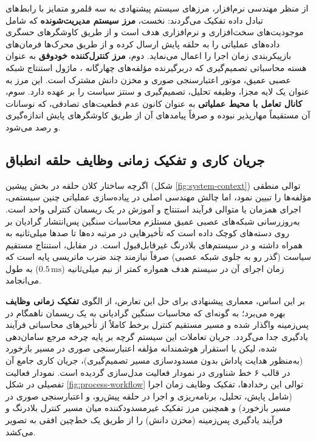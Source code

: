 \documentclass[oneside,openany,phd]{TMU-Thesis}
\begin{document}
از منظر مهندسی نرم‌افزار، مرزهای سیستم پیشنهادی به سه قلمرو متمایز با رابط‌های تبادل داده تفکیک می‌گردند:
نخست، \textbf{مرز سیستم مدیریت‌شونده} که شامل موجودیت‌های سخت‌افزاری و نرم‌افزاری هدف است و از طریق کاوشگرهای حسگری داده‌های عملیاتی را به حلقه پایش ارسال کرده و از طریق محرک‌ها فرمان‌های بازپیکربندی زمان اجرا را اعمال می‌نماید. دوم، \textbf{مرز کنترل‌کننده خودوفق} به عنوان هسته محاسباتی تصمیم‌گیری که دربرگیرنده مؤلفه‌های چهارگانه ، ماژول استنتاج شبکه عصبی عمیق، موتور اعتبارسنجی صوری و مخزن دانش مشترک است. این مرز به عنوان یک لایه مجزا، وظیفه تحلیل، تصمیم‌گیری و سنتز سیاست را بر عهده دارد. سوم، \textbf{کانال تعامل با محیط عملیاتی} به عنوان کانون عدم قطعیت‌های تصادفی، که نوسانات آن مستقیماً مهارپذیر نبوده و صرفاً پیامدهای آن از طریق کاوشگرهای پایش اندازه‌گیری و رصد می‌شود.

\subsection{جریان کاری و تفکیک زمانی وظایف حلقه انطباق}
\label{sec:system-loop}

اگرچه ساختار کلان حلقه  در بخش پیشین (شکل \ref{fig:system-context}) توالی منطقی مؤلفه‌ها را تبیین نمود، اما چالش مهندسی اصلی در پیاده‌سازی عملیاتی چنین سیستمی، اجرای همزمان یا متوالی فرآیند استنتاج و آموزش در یک ریسمان کنترلی واحد است. به‌روزرسانی شبکه‌های عصبی عمیق مستلزم محاسبات سنگین پس‌انتشار گرادیان بر روی دسته‌های کوچک داده است که تأخیرهایی در مرتبه ده‌ها تا صدها میلی‌ثانیه به همراه داشته و در سیستم‌های بلادرنگ غیرقابل‌قبول است. در مقابل، استنتاج مستقیم سیاست (گذر رو به جلوی شبکه عصبی) صرفاً نیازمند چند ضرب ماتریسی پایه است که زمان اجرای آن در سیستم هدف همواره کمتر از نیم میلی‌ثانیه ($0.5\,\text{ms}$) به طول می‌انجامد.

بر این اساس، معماری پیشنهادی برای حل این تعارض، از الگوی \textbf{تفکیک زمانی وظایف} بهره می‌برد؛ به گونه‌ای که محاسبات سنگین گرادیانی به یک ریسمان ناهمگام در پس‌زمینه واگذار شده و مسیر مستقیم کنترل برخط کاملاً از تأخیرهای محاسباتی فرآیند یادگیری جدا می‌گردد. جریان تعاملات این سیستم گرچه بر پایه چرخه مرجع  \cite{kephart2003vision} سامان‌دهی شده، لیکن با استقرار هوشمندانه مؤلفه اعتبارسنجی صوری در مسیر بازخورد (به‌منظور هدایت پاداش بدون مسدودسازی مسیر تصمیم‌گیری)، جریان کاری جامع آن در قالب ۶ خط شناوری در نمودار فعالیت  مدل‌سازی گردیده است. نمودار فعالیت تفصیلی در شکل \ref{fig:process-workflow} توالی این رخدادها، تفکیک وظایف زمان اجرا (شامل پایش، تحلیل، برنامه‌ریزی و اجرا در حلقه پیش‌رو، و اعتبارسنجی صوری در مسیر بازخورد) و همچنین مرز تفکیک غیرمسدودکننده میان مسیر کنترل بلادرنگ و فرآیند یادگیری پس‌زمینه (مخزن دانش) را از طریق یک خط‌چین افقی به تصویر می‌کشد.
\end{document}
